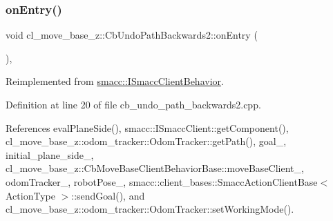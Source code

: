 \subsubsection{\texorpdfstring{on\+Entry()}{onEntry()}}
{\footnotesize\ttfamily void cl\+\_\+move\+\_\+base\+\_\+z\+::\+Cb\+Undo\+Path\+Backwards2\+::on\+Entry (\begin{DoxyParamCaption}{ }\end{DoxyParamCaption})\hspace{0.3cm}{\ttfamily [override]}, {\ttfamily [virtual]}}



Reimplemented from \hyperlink{classsmacc_1_1ISmaccClientBehavior_a9877684b1954429719826e2d0924d980}{smacc\+::\+I\+Smacc\+Client\+Behavior}.



Definition at line 20 of file cb\+\_\+undo\+\_\+path\+\_\+backwards2.\+cpp.



References eval\+Plane\+Side(), smacc\+::\+I\+Smacc\+Client\+::get\+Component(), cl\+\_\+move\+\_\+base\+\_\+z\+::odom\+\_\+tracker\+::\+Odom\+Tracker\+::get\+Path(), goal\+\_\+, initial\+\_\+plane\+\_\+side\+\_\+, cl\+\_\+move\+\_\+base\+\_\+z\+::\+Cb\+Move\+Base\+Client\+Behavior\+Base\+::move\+Base\+Client\+\_\+, odom\+Tracker\+\_\+, robot\+Pose\+\_\+, smacc\+::client\+\_\+bases\+::\+Smacc\+Action\+Client\+Base$<$ Action\+Type $>$\+::send\+Goal(), and cl\+\_\+move\+\_\+base\+\_\+z\+::odom\+\_\+tracker\+::\+Odom\+Tracker\+::set\+Working\+Mode().


